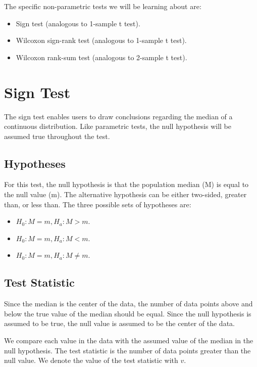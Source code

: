 \documentclass[
]{book}
\providecommand{\tightlist}{%
  \setlength{\itemsep}{0pt}\setlength{\parskip}{0pt}}
\theoremstyle{definition}
\theoremstyle{definition}
\theoremstyle{definition}
\theoremstyle{definition}
\theoremstyle{remark}
\begin{document}
The specific non-parametric tests we will be learning about are:

\begin{itemize}
\tightlist
\item
  Sign test (analogous to 1-sample t test).
\item
  Wilcoxon sign-rank test (analogous to 1-sample t test).
\item
  Wilcoxon rank-sum test (analogous to 2-sample t test).
\end{itemize}

\hypertarget{sign-test}{%
\section{Sign Test}\label{sign-test}}

The sign test enables users to draw conclusions regarding the median of a continuous distribution. Like parametric tests, the null hypothesis will be assumed true throughout the test.

\hypertarget{hypotheses}{%
\subsection{Hypotheses}\label{hypotheses}}

For this test, the null hypothesis is that the population median (M) is equal to the null value (m). The alternative hypothesis can be either two-sided, greater than, or less than. The three possible sets of hypotheses are:

\begin{itemize}
\tightlist
\item
  \(H_0: M = m, H_a: M > m\).
\item
  \(H_0: M = m, H_a: M < m\).
\item
  \(H_0: M = m, H_a: M \neq m\).
\end{itemize}

\hypertarget{test-statistic-1}{%
\subsection{Test Statistic}\label{test-statistic-1}}

Since the median is the center of the data, the number of data points above and below the true value of the median should be equal. Since the null hypothesis is assumed to be true, the null value is assumed to be the center of the data.

We compare each value in the data with the assumed value of the median in the null hypothesis. The test statistic is the number of data points greater than the null value. We denote the value of the test statistic with \(v\).
\end{document}
